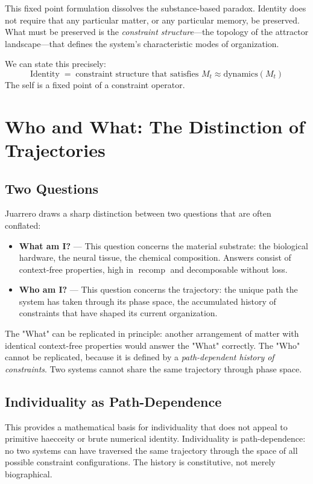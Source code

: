 \documentclass[11pt]{article}
\newcommand{\recomp}{\operatorname{recomp}}
\begin{document}
This fixed point formulation dissolves the substance-based paradox. Identity does not
require that any particular matter, or any particular memory, be preserved. What must be
preserved is the \emph{constraint structure}---the topology of the attractor landscape---that
defines the system's characteristic modes of organization.

We can state this precisely:
\[
\text{Identity} \;=\; \text{constraint structure that satisfies } M_t \approx \mathrm{dynamics}(M_t)
\]
The self is a fixed point of a constraint operator.

\section{Who and What: The Distinction of Trajectories}

\subsection{Two Questions}

Juarrero draws a sharp distinction between two questions that are often conflated:

\begin{itemize}
  \item \textbf{What am I?} --- This question concerns the material substrate: the
        biological hardware, the neural tissue, the chemical composition. Answers consist
        of context-free properties, high in $\recomp$ and decomposable without loss.
  \item \textbf{Who am I?} --- This question concerns the trajectory: the unique path the
        system has taken through its phase space, the accumulated history of constraints
        that have shaped its current organization.
\end{itemize}

The "What" can be replicated in principle: another arrangement of matter with identical
context-free properties would answer the "What" correctly. The "Who" cannot be replicated,
because it is defined by a \emph{path-dependent history of constraints}. Two systems
cannot share the same trajectory through phase space.

\subsection{Individuality as Path-Dependence}

This provides a mathematical basis for individuality that does not appeal to primitive
haecceity or brute numerical identity. Individuality is path-dependence: no two systems
can have traversed the same trajectory through the space of all possible constraint
configurations. The history is constitutive, not merely biographical.
\end{document}
